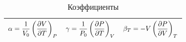 \begin{table}[h]
\caption{Коэффициенты}
    \centering
    \begin{tabular}{c|c|c}
    \toprule
        $\alpha = \dfrac{1}{V_0} \left(\dfrac{\partial {V}}{\partial {T}} \right)_{P} $ &
        $\gamma  = \dfrac{1}{P_0} \left(\dfrac{\partial {P}}{\partial {T}} \right)_{V}$ & 
        $\beta_T =   -V          \left(\dfrac{\partial {P}}{\partial {V}} \right)_{T} $ \\
    \bottomrule
    \end{tabular}
    \label{tab1}
\end{table}